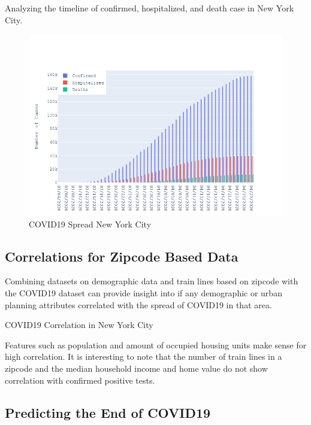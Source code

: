 \documentclass{homework}
\begin{document}
Analyzing the timeline of confirmed, hospitalized, and death case in New York City.

\begin{figure}[H]
  \centering
  \includegraphics[scale=0.45]{task5/task5_timeline.png}
  \caption{COVID19 Spread New York City}
\end{figure}

\newpage
\subsection{Correlations for Zipcode Based Data}

Combining datasets on demographic data and train lines based on zipcode with the COVID19 dataset can provide insight into if any demographic or urban planning attributes correlated with the spread of COVID19 in that area. 

\begin{table}[H]
  \caption{COVID19 Correlation in New York City}
  \label{Task 5 Correlation}
  \centering
  
\end{table}

Features such as population and amount of occupied housing units make sense for high correlation. It is interesting to note that the number of train lines in a zipcode and the median household income and home value do not show correlation with confirmed positive tests.

\newpage
\subsection{Predicting the End of COVID19}
\end{document}
